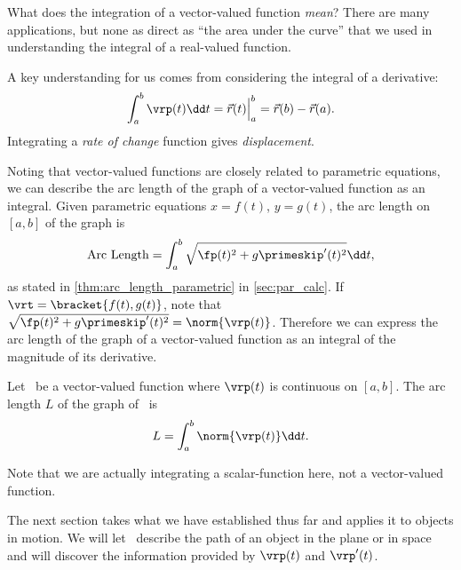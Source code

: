 What does the integration of a vector-valued function \emph{mean}? There are many applications, but none as direct as ``the area under the curve'' that we used in understanding the integral of a real-valued function.

A key understanding for us comes from considering the integral of a derivative: \[\int_a^b \vrp(t)\dd t = \vec r(t)\Big|_a^b = \vec r(b)-\vec r(a).\]
Integrating a \emph{rate of change} function gives \emph{displacement}.

Noting that vector-valued functions are closely related to parametric equations, we can describe the arc length of the graph of a vector-valued function as an integral. Given parametric equations $x=f(t)$, $y=g(t)$, the arc length on $[a,b]$ of the graph is
\[\text{Arc Length} = \int_a^b\sqrt{\fp(t)^2+g\primeskip'(t)^2}\dd t,\]
as stated in \autoref{thm:arc_length_parametric} in \autoref{sec:par_calc}. If $\vrt =\bracket{f(t), g(t)}$, note that $\sqrt{\fp(t)^2+g\primeskip'(t)^2} = \norm{\vrp(t)}$. Therefore we can express the arc length of the graph of a vector-valued function as an integral of the magnitude of its derivative.

\begin{theorem}\label{thm:vvf_arc_length}
Let \vrt\ be a vector-valued function where $\vrp(t)$ is continuous on $[a,b]$. The arc length $L$ of the graph of \vrt\ is 
\[L = \int_a^b \norm{\vrp(t)}\dd t.\]
\end{theorem}

Note that we are actually integrating a scalar-function here, not a vector-valued function.

The next section takes what we have established thus far and applies it to objects in motion. We will let \vrt\ describe the path of an object in the plane or in space and will discover the information provided by $\vrp(t)$ and $\vrp'(t)$.

